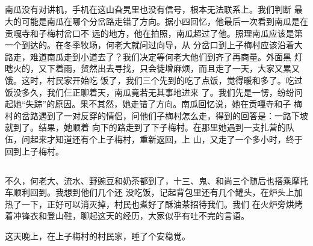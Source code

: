 ﻿\documentclass[hyperref={bookmarks=ture}xcolor=pdflatex,svgnames,table,compress]{beamer}
\begin{document}
\subsection{}
\begin{frame}
  \begin{ztebox} {\footnotesize 南瓜没有对讲机，手机在这山旮旯里也没有信号，根本无法联系上。我们判断
      最大的可能是南瓜在哪个分岔路走错了方向。据小四回忆，他最后一次看到南瓜是在贡嘎寺和子梅村岔口不
      远的地方，他在拍照，南瓜超过了他。照理南瓜应该是第一个到达的。在冬季牧场，何老大就问过向导，从
      分岔口到上子梅村应该沿着大路走，难道南瓜走到小道去了？我们决定等何老大他们到齐了再商量。外面黑
      灯瞎火的，又下着雨，贸然出去寻找，只会徒增麻烦，而且走了一天，大家又累又饿。这时，村民家开始吃
      饭了，我们三个先到的吃了点饭，觉得暖和多了。吃过饭没多久，我们仨正聊着天，南瓜竟若无其事地进来
      了。我们先是一愣，纷纷问起她“失踪”的原因。果不其然，她走错了方向。南瓜回忆说，她在贡嘎寺和子
      梅村的岔路遇到了一对反穿的情侣，问他们子梅村怎么走，得到的回答是：一路下坡就到了。结果，她顺着
      向下的路走到了下子梅村。在那里她遇到一支扎营的队伍，问起来才知道还有个上子梅村，重新返回，上
      山，又走了一个多小时，终于回到上子梅村。}
\end{ztebox}
\end{frame}

\subsection{}
\begin{frame}
\begin{ztebox} 
{\footnotesize
不久，何老大、流水、野豌豆和奶茶都到了，十三、鬼、和尚三个随后也搭乘摩托车顺利回到。我想到他们几个还
没吃饭，记起背包里还有几个罐头，在炉头上加热了一下，正好可以消灭掉，村民也煮好了酥油茶招待我们。我们
在火炉旁烘烤着冲锋衣和登山鞋，聊起这天的经历，大家似乎有吐不完的言语。

这天晚上，在上子梅村的村民家，睡了个安稳觉。}
\end{ztebox}
\end{frame}

\subsection{}
\begin{frame}
\begin{center}
\end{center}
\end{frame}
\end{document}
